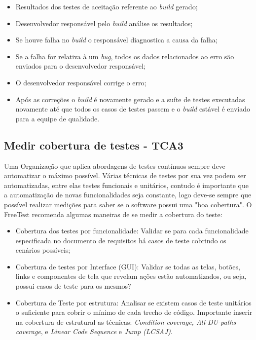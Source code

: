 \begin{itemize}
	\item Resultados dos testes de aceitação referente ao \textit{build} gerado;
	\item Desenvolvedor responsável pelo \textit{build} análise os resultados;
	\item Se houve falha no \textit{build} o responsável diagnostica a causa da falha;
	\item Se a falha for relativa à um \textit{bug}, todos os dados relacionados ao erro são enviados para o desenvolvedor responsável;
	\item O desenvolvedor responsável corrige o erro;
	\item Após as correções o \textit{build} é novamente gerado e a suíte de testes executadas novamente até que todos os casos de testes passem e o \textit{build} estável é enviado para a equipe de qualidade.
\end{itemize}

\subsection{Medir cobertura de testes - TCA3}

Uma Organização que aplica abordagens de testes contínuos sempre deve automatizar o máximo possível. Várias técnicas de testes por sua vez podem ser automatizadas, entre elas testes funcionais e unitários, contudo é importante que a automatização de novas funcionalidades seja constante, logo deve-se sempre que possível realizar medições para saber se o software possui uma "boa cobertura". O FreeTest recomenda algumas maneiras de se medir a cobertura do teste:

\begin{itemize}
    \item Cobertura dos testes por funcionalidade: Validar se para cada funcionalidade especificada no documento de requisitos há casos de teste cobrindo os cenários possíveis;
    \item Cobertura de testes por Interface (GUI): Validar se todas as telas, botões, links e componentes de tela que revelam ações estão automatizados, ou seja, possui casos de teste para os mesmos?
    \item Cobertura de Teste por estrutura: Analisar se existem casos de teste unitários o suficiente para cobrir o mínimo de cada trecho de código. Importante inserir na cobertura de estrutural as técnicas: \textit{Condition coverage, All-DU-paths coverage}, e \textit{Linear Code Sequence} e \textit{Jump (LCSAJ)}.

\end{itemize}

